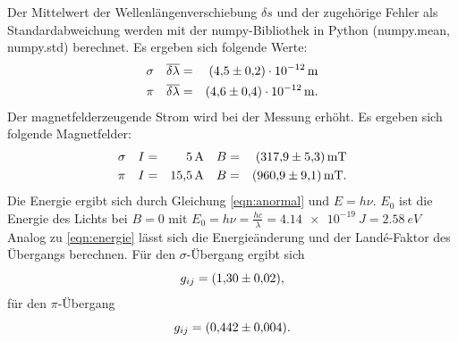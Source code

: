 %
%
Der Mittelwert der Wellenlängenverschiebung $\delta s$ und der zugehörige Fehler als Standardabweichung werden mit der numpy-Bibliothek in Python (numpy.mean, numpy.std) berechnet.
Es ergeben sich folgende Werte:
\begin{align*}
  \sigma  &&  \overline{\delta \lambda} &=& \SI{4.5 \pm 0.2 e-12}{m} \\
  \pi     &&  \overline{\delta \lambda} &=& \SI{4.6 \pm 0.4 e-12}{m}. \\
\end{align*}
Der magnetfelderzeugende Strom wird bei der Messung erhöht.
Es ergeben sich folgende Magnetfelder:
\begin{align*}
  \sigma  &&   I &=& \SI{5}{A}     && B &=& \SI{317.9 \pm 5.3}{mT}\\
  \pi    &&   I &=& \SI{15.5}{A}  && B &=& \SI{960.9 \pm 9.1}{mT}.\\
\end{align*}
Die Energie ergibt sich durch Gleichung \eqref{eqn:anormal} und $E= h \nu$.
$E_0$ ist die Energie des Lichts bei $B=0$ mit $E_0=h \nu = \frac{hc}{\lambda}= \SI{4.14e-19}{J}=\SI{2.58}{eV}$
Analog zu \eqref{eqn:energie} lässt sich die Energieänderung und der Landé-Faktor des Übergangs berechnen.
Für den $\sigma$-Übergang ergibt sich
\begin{equation*}
  g_{ij} = \SI{1.30 \pm 0.02}{},
\end{equation*}
für den $\pi$-Übergang
\begin{equation*}
  g_{ij} = \SI{0.442 \pm 0.004}{}.
\end{equation*}

\FloatBarrier
%
